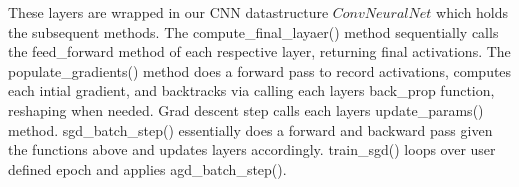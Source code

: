 These layers are wrapped in our CNN datastructure $ConvNeuralNet$ which holds the subsequent methods. The compute_final_layaer() method sequentially calls the 
feed_forward method of each respective layer, returning final activations. The populate_gradients() method does a forward pass to record activations, computes 
each intial gradient, and backtracks via calling each layers back_prop function, reshaping when needed. Grad descent step calls each layers update_params() method. 
sgd_batch_step() essentially does a forward and backward pass given the functions above and updates layers accordingly. train_sgd() loops over user defined epoch and applies 
agd_batch_step(). 






